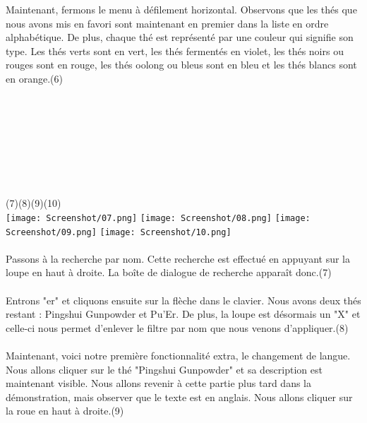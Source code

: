 \documentclass[a4paper,12pt]{article}
\begin{document}
\begin{spacing}{1}
	Maintenant, fermons le menu à défilement horizontal. Observons que les thés que nous avons mis en favori sont maintenant en premier dans la liste en ordre alphabétique.
	De plus, chaque thé est représenté par une couleur qui signifie son type. Les thés verts sont en vert, les thés fermentés en violet, les thés noirs ou rouges sont en rouge, les thés oolong ou bleus sont en bleu et les thés blancs sont en orange.(6)
	\\\\\\\\\\\\\\\\\\
	(7)\space\space\space\space\space\space\space\space\space\space\space\space\space\space\space\space\space\space\space\space\space\space\space\space\space(8)\space\space\space\space\space\space\space\space\space\space\space\space\space\space\space\space\space\space\space\space\space\space\space\space(9)\space\space\space\space\space\space\space\space\space\space\space\space\space\space\space\space\space\space\space\space\space\space\space\space\space(10)\\
	\texttt{[image: Screenshot/07.png]}    
	\texttt{[image: Screenshot/08.png]}    
	\texttt{[image: Screenshot/09.png]}    
	\texttt{[image: Screenshot/10.png]}\\\\
	Passons à la recherche par nom. Cette recherche est effectué en appuyant sur la loupe en haut à droite. La boîte de dialogue de recherche apparaît donc.(7)\\\\
	Entrons "er" et cliquons ensuite sur la flèche dans le clavier. Nous avons deux thés restant : Pingshui Gunpowder et Pu'Er. De plus, la loupe est désormais un "X" et celle-ci nous permet d'enlever le filtre par nom que nous venons d'appliquer.(8)\\\\
	Maintenant, voici notre première fonctionnalité extra, le changement de langue. Nous allons cliquer sur le thé "Pingshui Gunpowder" et sa description est maintenant visible. Nous allons revenir à cette partie plus tard dans la démonstration, mais observer que le texte est en anglais. Nous allons cliquer sur la roue en haut à droite.(9) \\\\

\end{spacing}
\end{document}
